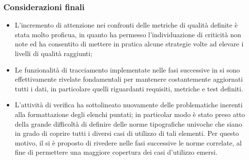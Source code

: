 \subsubsection{Considerazioni finali}
\begin{itemize}
\item L'incremento di attenzione nei confronti delle metriche di qualità definite è stata molto proficua, in quanto ha permesso l'individuazione di criticità non note ed ha consentito di mettere in pratica alcune strategie volte ad elevare i livelli di qualità raggiunti;
\item Le funzionalità di tracciamento implementate nelle fasi successive in \pragmadb si sono effettivamente rivelate fondamentali per mantenere costantemente aggiornati tutti i dati, in particolare quelli riguardanti requisiti, metriche e test definiti.
\item L'attività di verifica ha sottolineato nuovamente delle problematiche inerenti alla formattazione degli elenchi puntati; in particolar modo è stato preso atto della grande difficoltà di definire delle norme tipografiche univoche che siano in grado di coprire tutti i diversi casi di utilizzo di tali elementi. Per questo motivo, il  si è proposto di rivedere nelle fasi successive le norme correlate, al fine di permettere una maggiore copertura dei casi d'utilizzo emersi.
\end{itemize}
